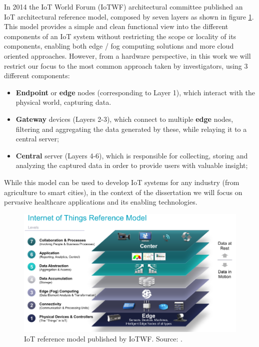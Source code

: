 In 2014 the \acs{IoT} World Forum (IoTWF) architectural committee published an \acs{IoT} architectural reference model, composed by seven layers as shown in figure \ref{fig:iotwf-referencemodel}. This model provides a simple and clean functional view into the different components of an \acs{IoT} system without restricting the scope or locality of its components, enabling both edge / fog computing solutions and more cloud oriented approaches. However, from a hardware perspective, in this work we will restrict our focus to the most common approach taken by investigators, using 3 different components: 

\begin{itemize}
    \item \textbf{Endpoint} or \textbf{edge} nodes (corresponding to Layer 1), which interact with the physical world, capturing data.
    \item \textbf{Gateway} devices (Layers 2-3), which connect to multiple \textbf{edge} nodes, filtering and aggregating the data generated by these, while relaying it to a central server; 
    \item \textbf{Central} server (Layers 4-6), which is responsible for collecting, storing and analyzing the captured data in order to provide users with valuable insight;
\end{itemize}

While this model can be used to develop IoT systems for any industry (from agriculture to smart cities), in the context of the dissertation we will focus on pervasive healthcare applications and its enabling technologies. 


\begin{figure}[H]
    \centering
    \includegraphics[width=0.85\linewidth]{images/iotwf-referencemodel.png}
    \caption[IoT reference model published by IoTWF.]{IoT reference model published by IoTWF. Source: \cite{Cisco2014}.}
    \label{fig:iotwf-referencemodel}
\end{figure}

